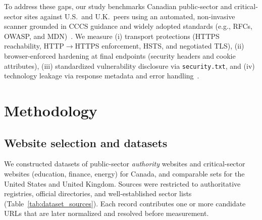 \documentclass[conference]{IEEEtran}
\begin{document}
  To address these gaps, our study benchmarks Canadian public-sector and critical-sector sites against U.S.\ and U.K.\ peers using an automated, non-invasive scanner grounded in CCCS guidance and widely adopted standards (e.g., RFCs, OWASP, and MDN)~\cite{cccs-itsp-40062,cccs-itsm-60005,owasp_http_security_response_headers,mdn_sts_header}. 
  We measure 
  (i) transport protections (HTTPS reachability, HTTP$\rightarrow$HTTPS enforcement, HSTS, and negotiated TLS), 
  (ii) browser-enforced hardening at final endpoints (security headers and cookie attributes), 
  (iii) standardized vulnerability disclosure via \texttt{security.txt}, and 
  (iv) technology leakage via response metadata and error handling~\cite{rfc6797,rfc9116,owasp_secure_headers_project,cwe_209}.

\section{Methodology}
\label{sec:method}

\subsection{Website selection and datasets}
  We constructed datasets of public-sector \emph{authority} websites and critical-sector websites (education, finance, energy) for Canada, and comparable sets for the United States and United Kingdom. Sources were restricted to authoritative registries, official directories, and well-established sector lists (Table~\ref{tab:dataset_sources}). Each record contributes one or more candidate URLs that are later normalized and resolved before measurement.
\end{document}
